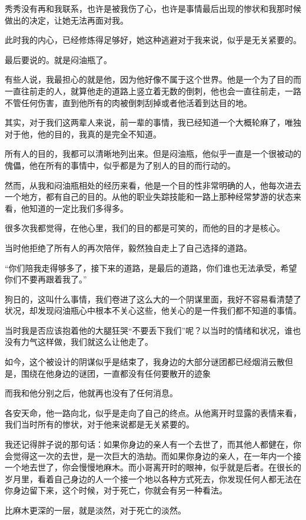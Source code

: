 秀秀没有再和我联系，也许是被我伤了心，也许是事情最后出现的惨状和我那时候做出的决定，让她无法再面对我。

此时我的内心，已经修炼得足够好，她这种逃避对于我来说，似乎是无关紧要的。

最后要说的。就是闷油瓶了。

有些人说，我最担心的就是他，因为他好像不属于这个世界。他是一个为了目的而一直往前走的人，就算他走的道路上竖立着无数的倒刺，他也会一直往前走，一路不管任何伤害，直到他所有的肉被倒刺刮掉或者他活着到达目的地。

其实，对于我们这两辈人来说，前一辈的事情，我已经知道一个大概轮麻了，唯独对于他，他的目的，我真的是完全不知道。

所有人的目的，我都可以清晰地列出来。但是闷油瓶，他似乎一直是一个很被动的傀儡，他在所有的事情中，似乎都是为了别人的目的而行动的。

然而，从我和闷油瓶相处的经历来看，他是一个目的性非常明确的人，他每次进去一个地方，都有自己的目的。从他的职业失踪技能和一路上那种经常梦游的状态来看，他知道的一定比我们多得多。

很多次我都觉得，在他心里，我们的目的都是可笑的，而他的目的才是核心。

当时他拒绝了所有人的再次陪伴，毅然独自走上了自己选择的道路。

“你们陪我走得够多了，接下来的道路，是最后的道路，你们谁也无法承受，希望你们不要再跟着我了。”

狗日的，这叫什么事情，我们卷进了这么大的一个阴谋里面，我好不容易看清楚了状况，却发现闷油瓶心中根本不关心这些，他关心的是一件我们都不知道的事情。

当时我是否应该抱着他的大腿狂哭“不要丢下我们”呢？以当时的情绪和状况，谁也没有力气这样做，我们就这么让他走了。

如今，这个被设计的阴谋似乎是结束了，我身边的大部分谜团都已经烟消云散但是，围绕在他身边的谜团，一直都没有任何要散开的迹象

而我和他分别之后，他就再也没有了任何消息。

各安天命，他一路向北，似乎是走向了自己的终点。从他离开时显露的表情来看，我们当时所有的惨状，对于他来说都是无关紧要的。

我还记得胖子说的那句话：如果你身边的亲人有一个去世了，而其他人都健在，你会觉得这一次的去世，是一次巨大的浩劫。而如果你身边的亲人，在一年内一个接一个地去世了，你会慢慢地麻木。而小哥离开时的眼神，似乎就是后者。在很长的岁月里，看着自己身边的人一个接一个地以各种方式死去，你发现任何人都无法在你身边留下来，这个时候，对于死亡，你就会有另一种看法。

比麻木更深的一层，就是淡然，对于死亡的淡然。

